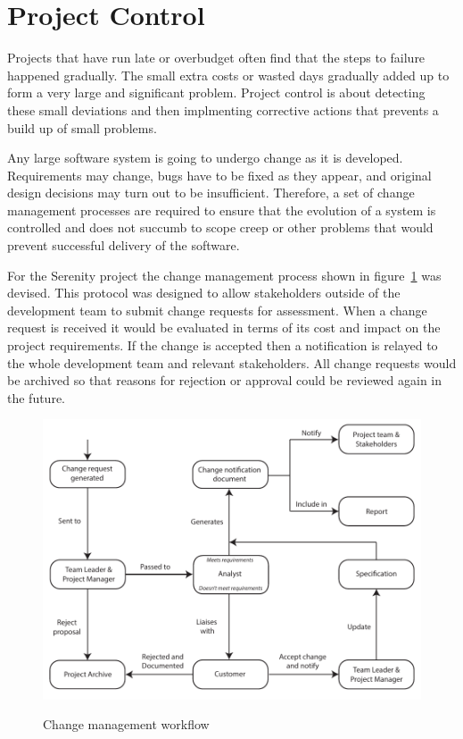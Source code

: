 \section{Project Control}
\label{section:control}


Projects that have run late or overbudget often find that the steps to failure happened gradually.
The small extra costs or wasted days gradually added up to form a very large and significant
problem. Project control is about detecting these small deviations and then implmenting corrective
actions that prevents a build up of small problems.

Any large software system is going to undergo change as it is developed. Requirements may change,
bugs have to be fixed as they appear, and original design decisions may turn out to be insufficient.
Therefore, a set of change management processes are required to ensure that the evolution of a
system is controlled and does not succumb to scope creep or other problems that would prevent
successful delivery of the software.

For the Serenity project the change management process shown in figure~\ref{fig:change_management}
was devised. This protocol was designed to allow stakeholders outside of the development team
to submit change requests for assessment. When a change request is received it would be evaluated
in terms of its cost and impact on the project requirements. If the change is accepted then a
notification is relayed to the whole development team and relevant stakeholders. All change requests
would be archived so that reasons for rejection or approval could be reviewed again in the future.

\begin{figure}
	\includegraphics{res/change_management_diagram}
	\label{fig:change_management}
	\caption{Change management workflow}
\end{figure}

